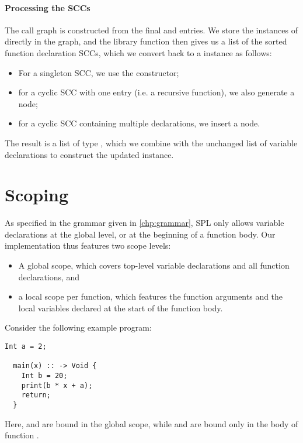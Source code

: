 \paragraph{Processing the SCCs}
The call graph is constructed from the final  and 
entries. We store the instances of  directly in the graph, and
the library function  then gives us a list of the sorted
function declaration SCCs, which we convert back to a  instance
as follows:
\begin{itemize}
  \item For a singleton SCC, we use the  constructor;
  \item for a cyclic SCC with one entry (i.e. a recursive function), we
        also generate a  node;
  \item for a cyclic SCC containing multiple declarations, we insert a
         node.
\end{itemize}
%
The result is a list of type , which we combine with
the unchanged list of variable declarations to construct the updated
 instance.



\section{Scoping}
As specified in the grammar given in \cref{chp:grammar}, SPL only allows
variable declarations at the global level, or at the beginning of a function
body. Our implementation thus features two scope levels:
\begin{itemize}
  \item A global scope, which covers top-level variable declarations and all
        function declarations, and
  \item a local scope per function, which features the function arguments and
        the local variables declared at the start of the function body.
\end{itemize}

Consider the following example program:
%
\begin{lstlisting}[language=SPL]
  Int a = 2;

  main(x) :: -> Void {
    Int b = 20;
    print(b * x + a);
    return;
  }
\end{lstlisting}
%
Here,  and  are bound in the global scope, while  and
 are bound only in the body of function .

